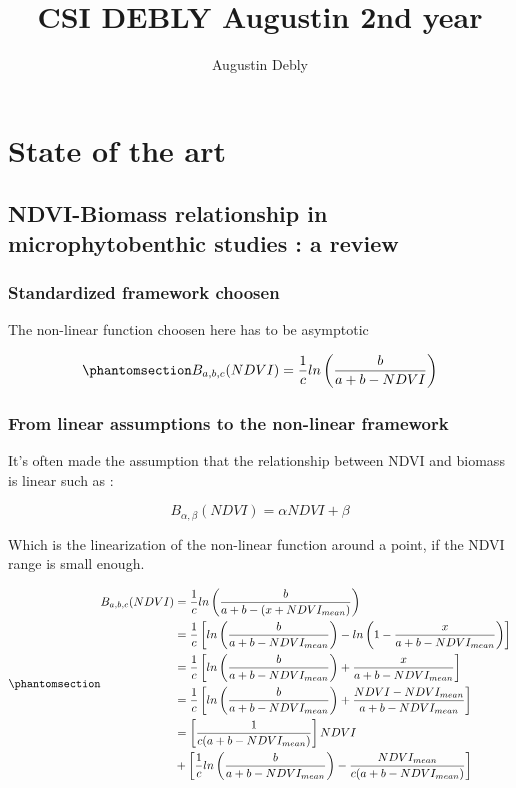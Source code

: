 \documentclass[
  letterpaper,
  DIV=11,
  numbers=noendperiod]{scrartcl}
\title{CSI DEBLY Augustin 2nd year}
\author{Augustin Debly}
\date{}
\begin{document}
\maketitle

\section{State of the art}\label{state-of-the-art}

\subsection{NDVI-Biomass relationship in microphytobenthic studies : a
review}\label{ndvi-biomass-relationship-in-microphytobenthic-studies-a-review}

\subsubsection{Standardized framework
choosen}\label{standardized-framework-choosen}

The non-linear function choosen here has to be asymptotic

\begin{equation}\phantomsection\label{eq-NDVIB}{
B_{a,b,c}(NDVI) = \frac{1}{c}ln\left(\frac{b}{a+b-NDVI}\right)
}\end{equation}

\subsubsection{From linear assumptions to the non-linear
framework}\label{from-linear-assumptions-to-the-non-linear-framework}

It's often made the assumption that the relationship between NDVI and
biomass is linear such as :

\[
B_{\alpha,\beta}(NDVI) = \alpha NDVI + \beta
\]

Which is the linearization of the non-linear function around a point, if
the NDVI range is small enough.

\begin{equation}\phantomsection\label{eq-linearNDVIB}{
\begin{aligned}
    B_{a,b,c}(NDVI) &= \frac{1}{c}ln\left(\frac{b}{a+b-(x+NDVI_{mean})}\right)\\
    &= \frac{1}{c}\left[ln\left(\frac{b}{a+b-NDVI_{mean}}\right)-ln\left(1-\frac{x}{a+b-NDVI_{mean}}\right)\right]\\
    &= \frac{1}{c}\left[ln\left(\frac{b}{a+b-NDVI_{mean}}\right)+\frac{x}{a+b-NDVI_{mean}}\right]\\
    &= \frac{1}{c}\left[ln\left(\frac{b}{a+b-NDVI_{mean}}\right)+\frac{NDVI - NDVI_{mean}}{a+b-NDVI_{mean}}\right]\\
    &= \left[\frac{1}{c(a+b-NDVI_{mean})}\right]NDVI\\&+\left[\frac{1}{c}ln\left(\frac{b}{a+b-NDVI_{mean}}\right)-\frac{NDVI_{mean}}{c(a+b-NDVI_{mean})}\right]\\
\end{aligned}
}\end{equation}
\end{document}
